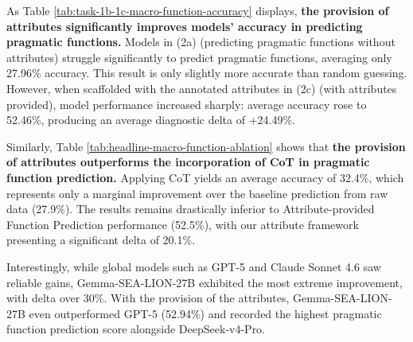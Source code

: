 \documentclass[11pt]{article}
\begin{document}
As Table \ref{tab:task-1b-1c-macro-function-accuracy} displays, \textbf{the provision of attributes significantly improves models' accuracy in predicting pragmatic functions.} Models in (2a) (predicting pragmatic functions without attributes) struggle significantly to predict pragmatic functions, averaging only 27.96\% accuracy. This result is only slightly more accurate than random guessing. However, when scaffolded with the annotated attributes in (2c) (with attributes provided), model performance increased sharply: average accuracy rose to 52.46\%, producing an average diagnostic delta of +24.49\%. 


Similarly, Table \ref{tab:headline-macro-function-ablation} shows that \textbf{the provision of attributes outperforms the incorporation of CoT in pragmatic function prediction.} Applying CoT yields an average accuracy of 32.4\%, which represents only a marginal improvement over the baseline prediction from raw data (27.9\%). The results remains drastically inferior to Attribute-provided Function Prediction performance (52.5\%), with our attribute framework presenting a significant delta of 20.1\%.


Interestingly, while global models such as GPT-5 and Claude Sonnet 4.6 saw reliable gains, Gemma-SEA-LION-27B exhibited the most extreme improvement, with delta over 30\%. With the provision of the attributes, Gemma-SEA-LION-27B even outperformed GPT-5 (52.94\%) and recorded the highest pragmatic function prediction score alongside DeepSeek-v4-Pro.
\end{document}
